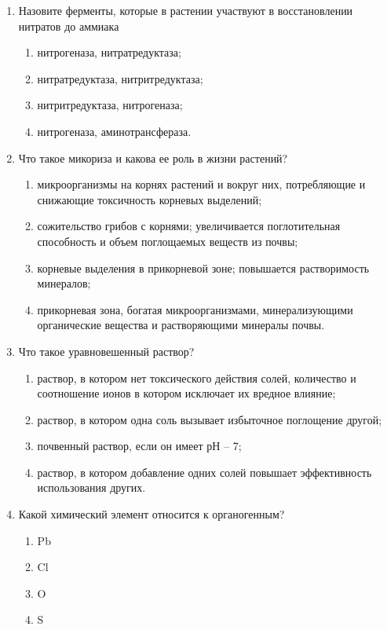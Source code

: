 \begin{enumerate}

\item Назовите ферменты,   которые в растении участвуют в восстановлении  нитратов до аммиака 
\begin{enumerate}
	\item нитрогеназа,  нитратредуктаза; 
	\item нитратредуктаза, нитритредуктаза; 
	\item нитритредуктаза, нитрогеназа; 
	\item нитрогеназа, аминотрансфераза.
\end{enumerate}

\item Что такое микориза и какова ее роль в жизни растений?
\begin{enumerate}
\item микроорганизмы на корнях растений и вокруг них, потребляющие и снижающие токсичность корневых выделений; 
\item сожительство грибов с корнями; увеличивается поглотительная способность и объем поглощаемых веществ из почвы; 
\item корневые выделения в прикорневой зоне; повышается растворимость минералов; 
\item прикорневая зона, богатая микроорганизмами, минерализующими органические вещества и растворяющими минералы почвы.
\end{enumerate}

\item Что такое уравновешенный раствор?
\begin{enumerate}
\item раствор, в котором нет токсического действия солей, количество и соотношение ионов в котором исключает их вредное влияние; 
\item раствор, в котором одна соль вызывает избыточное поглощение другой; 
\item почвенный раствор, если он имеет рН – 7; 
\item раствор, в котором добавление одних солей повышает эффективность использования других.
\end{enumerate}

\item Какой химический элемент относится к органогенным?
\begin{enumerate}
	\item Pb        
	\item Cl
	\item O          
	\item S
\end{enumerate}


\end{enumerate}
